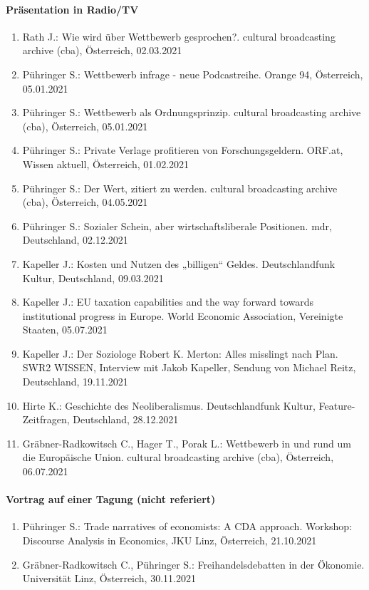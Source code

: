 \paragraph{Präsentation in Radio/TV}
\begin{enumerate}
	\item Rath J.: Wie wird über Wettbewerb gesprochen?. cultural broadcasting archive (cba), Österreich, 02.03.2021
	\item Pühringer S.: Wettbewerb infrage - neue Podcastreihe. Orange 94, Österreich, 05.01.2021
	\item Pühringer S.: Wettbewerb als Ordnungsprinzip. cultural broadcasting archive (cba), Österreich, 05.01.2021
	\item Pühringer S.: Private Verlage profitieren von Forschungsgeldern. ORF.at, Wissen aktuell, Österreich, 01.02.2021
	\item Pühringer S.: Der Wert, zitiert zu werden. cultural broadcasting archive (cba), Österreich, 04.05.2021
	\item Pühringer S.: Sozialer Schein, aber wirtschaftsliberale Positionen. mdr, Deutschland, 02.12.2021
	\item Kapeller J.: Kosten und Nutzen des „billigen“ Geldes. Deutschlandfunk Kultur, Deutschland, 09.03.2021
	\item Kapeller J.: EU taxation capabilities and the way forward towards institutional progress in Europe. World Economic Association, Vereinigte Staaten, 05.07.2021
	\item Kapeller J.: Der Soziologe Robert K. Merton: Alles misslingt nach Plan. SWR2 WISSEN, Interview mit Jakob Kapeller, Sendung von Michael Reitz, Deutschland, 19.11.2021
	\item Hirte K.: Geschichte des Neoliberalismus. Deutschlandfunk Kultur, Feature-Zeitfragen, Deutschland, 28.12.2021
	\item Gräbner-Radkowitsch C., Hager T., Porak L.: Wettbewerb in und rund um die Europäische Union. cultural broadcasting archive (cba), Österreich, 06.07.2021
\end{enumerate}
\paragraph{Vortrag auf einer Tagung (nicht referiert)}
\begin{enumerate}
	\item Pühringer S.: Trade narratives of economists: A CDA approach. Workshop: Discourse Analysis in Economics, JKU Linz, Österreich, 21.10.2021
	\item Gräbner-Radkowitsch C., Pühringer S.: Freihandelsdebatten in der Ökonomie. Universität Linz, Österreich, 30.11.2021
\end{enumerate}
